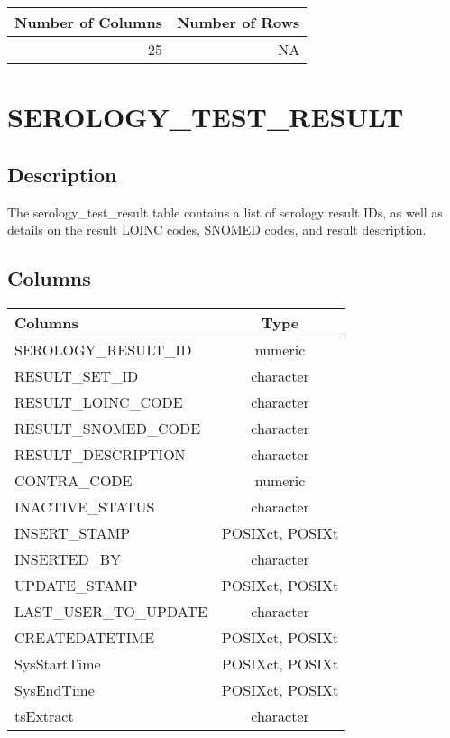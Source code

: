 \documentclass[
  letterpaper,
  DIV=11,
  numbers=noendperiod]{scrreprt}
\begin{document}
\begin{longtable}{rr}
\toprule
Number of Columns & Number of Rows \\ 
\midrule
25 & NA \\ 
\bottomrule
\end{longtable}

\hypertarget{serology_test_result}{%
\chapter*{SEROLOGY\_TEST\_RESULT}\label{serology_test_result}}

\hypertarget{description-38}{%
\section*{Description}\label{description-38}}

The serology\_test\_result table contains a list of serology result IDs,
as well as details on the result LOINC codes, SNOMED codes, and result
description.

\hypertarget{columns-38}{%
\section*{Columns}\label{columns-38}}

\begin{longtable}{lc}
\toprule
Columns & Type \\ 
\midrule
SEROLOGY\_RESULT\_ID & numeric \\ 
RESULT\_SET\_ID & character \\ 
RESULT\_LOINC\_CODE & character \\ 
RESULT\_SNOMED\_CODE & character \\ 
RESULT\_DESCRIPTION & character \\ 
CONTRA\_CODE & numeric \\ 
INACTIVE\_STATUS & character \\ 
INSERT\_STAMP & POSIXct, POSIXt \\ 
INSERTED\_BY & character \\ 
UPDATE\_STAMP & POSIXct, POSIXt \\ 
LAST\_USER\_TO\_UPDATE & character \\ 
CREATEDATETIME & POSIXct, POSIXt \\ 
SysStartTime & POSIXct, POSIXt \\ 
SysEndTime & POSIXct, POSIXt \\ 
tsExtract & character \\ 
\bottomrule
\end{longtable}
\end{document}

